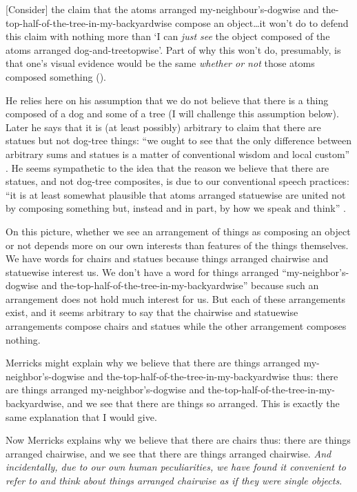 \documentclass[11pt]{article}
\newenvironment{squote}{%
\begin{spacing}{1}
       	\begin{list}{}{%
\setlength{\labelwidth}{0pt}%
\rightmargin\leftmargin%
}
\item\relax
}{%
\end{list}%
\end{spacing}
}
\begin{document}
\begin{spacing}{1.25}
\begin{squote}
{[}Consider{]} the claim that the atoms arranged my-neighbour's-dogwise
and the-top-half-of-the-tree-in-my-backyardwise compose an
object\ldots{}it won't do to defend this claim with nothing more than `I
can \emph{just see} the object composed of the atoms arranged
dog-and-treetopwise'. Part of why this won't do, presumably, is that
one's visual evidence would be the same \emph{whether or not} those
atoms composed something (\citeyear[8--9]{merricks2001a}).
\end{squote}

He relies here on his assumption that we do not believe that there is
a thing composed of a dog and some of a tree (I will challenge this
assumption below).  Later he says that it is (at least possibly)
arbitrary to claim that there are statues but not dog-tree things:
``we ought to see that the only difference between arbitrary sums and
statues is a matter of conventional wisdom and local custom''
\citeyearpar[75]{merricks2001a}.  He seems sympathetic to the idea
that the reason we believe that there are statues, and not dog-tree
composites, is due to our conventional speech practices: ``it is at
least somewhat plausible that atoms arranged statuewise are united not
by composing something but, instead and in part, by how we speak and
think'' \citeyearpar[121]{merricks2001a}.

On this picture, whether we see an arrangement of things as composing
an object or not depends more on our own interests than features of
the things themselves.  We have words for chairs and statues because
things arranged chairwise and statuewise interest us.  We don't have a
word for things arranged ``my-neighbor's-dogwise and
the-top-half-of-the-tree-in-my-backyardwise'' because such an
arrangement does not hold much interest for us.  But each of these
arrangements exist, and it seems arbitrary to say that the chairwise
and statuewise arrangements compose chairs and statues while the other
arrangement composes nothing.

Merricks might explain why we believe that there are things arranged
my-neighbor's-dogwise and the-top-half-of-the-tree-in-my-backyardwise
thus: there are things arranged my-neighbor's-dogwise and
the-top-half-of-the-tree-in-my-backyardwise, and we see that there are
things so arranged.  This is exactly the same explanation that I would
give.

Now Merricks explains why we believe that there are chairs thus: there
are things arranged chairwise, and we see that there are things
arranged chairwise.  {\em And incidentally, due to our own human
  peculiarities, we have found it convenient to refer to and think
  about things arranged chairwise as if they were single objects}.


\end{spacing}
\end{document}
